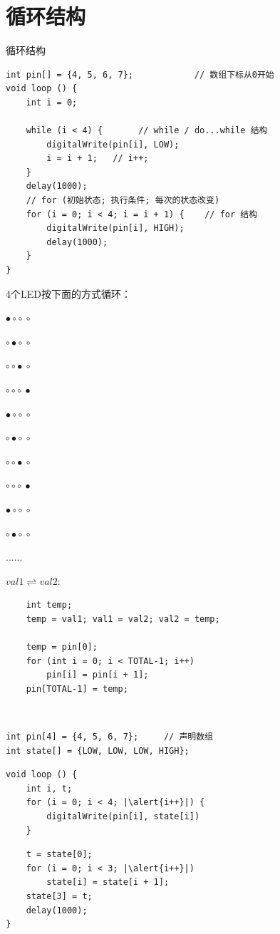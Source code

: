 \documentclass[a4paper,11pt]{seminar}
\newcommand{\alert}[1]{\textcolor{red}{#1}}
\begin{document}
\chapter{循环结构}{循环结构}
~\ \vskip-6mm
\begin{lstlisting}
int pin[] = {4, 5, 6, 7};            // 数组下标从0开始
void loop () {
    int i = 0;

    while (i < 4) {       // while / do...while 结构
        digitalWrite(pin[i], LOW);
        i = i + 1;   // i++;
    }
    delay(1000);
    // for (初始状态; 执行条件; 每次的状态改变)
    for (i = 0; i < 4; i = i + 1) {    // for 结构
        digitalWrite(pin[i], HIGH);
        delay(1000);
    }
}
\end{lstlisting}
\endslide

4个LED按下面的方式循环：

\begingroup
\fontsize{12}{8}\selectfont
\color{red}
$\bullet\circ\circ~\circ$

$\circ\bullet\circ~\circ$

$\circ\circ\bullet~\circ$

$\circ\circ\circ~\bullet$

$\bullet\circ\circ~\circ$

$\circ\bullet\circ~\circ$

$\circ\circ\bullet~\circ$

$\circ\circ\circ~\bullet$

$\bullet\circ\circ~\circ$

$\circ\bullet\circ~\circ$

......
\endgroup
\endslide


 $val1 \rightleftharpoons val2$:
\begin{lstlisting}
    int temp;
    temp = val1; val1 = val2; val2 = temp;

    temp = pin[0];
    for (int i = 0; i < TOTAL-1; i++)
        pin[i] = pin[i + 1];
    pin[TOTAL-1] = temp;
\end{lstlisting}
\endslide


~\ \vskip-6mm
\begin{lstlisting}
int pin[4] = {4, 5, 6, 7};     // 声明数组
int state[] = {LOW, LOW, LOW, HIGH};
\end{lstlisting}
\pause
\begin{lstlisting}
void loop () {
    int i, t;
    for (i = 0; i < 4; |\alert{i++}|) {
        digitalWrite(pin[i], state[i])
    }
\end{lstlisting}
\pause
\begin{lstlisting}
    t = state[0];
    for (i = 0; i < 3; |\alert{i++}|)
        state[i] = state[i + 1];
    state[3] = t;
    delay(1000);
}
\end{lstlisting}
\endslide
\end{document}
